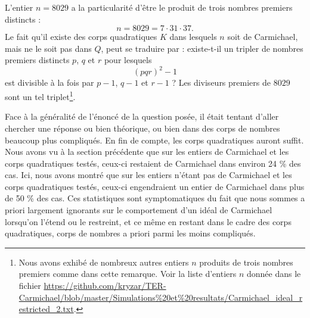 \begin{remarque}
	L'entier $n = 8029$ a la particularité d'être le produit de trois nombres premiers distincts : \[n = 8029 = 7 \cdot 31 \cdot 37.\] Le fait qu'il existe des corps quadratiques $K$ dans lesquels $n$ soit de Carmichael, mais ne le soit pas dans $Q$, peut se traduire par : existe-t-il un tripler de nombres premiers distincts $p$, $q$ et $r$ pour lesquels \[(pqr)^2 - 1\] est divisible à la fois par $p-1$, $q-1$ et $r-1$ ? Les diviseurs premiers de $8029$ sont un tel triplet\footnote{Nous avons exhibé de nombreux autres entiers $n$ produits de trois nombres premiers comme dans cette remarque. Voir la liste d'entiers $n$ donnée dans le fichier \url{https://github.com/kryzar/TER-Carmichael/blob/master/Simulations\%20et\%20resultats/Carmichael\_ideal\_restricted\_2.txt}.}.
\end{remarque}

Face à la généralité de l'énoncé de la question posée, il était tentant d'aller chercher une réponse ou bien théorique, ou bien dans des corps de nombres beaucoup plus compliqués. En fin de compte, les corps quadratiques auront suffit. Nous avons vu à la section précédente que sur les entiers de Carmichael et les corps quadratiques testés, ceux-ci restaient de Carmichael dans environ 24 \% des cas. Ici, nous avons montré que sur les entiers n'étant pas de Carmichael et les corps quadratiques testés, ceux-ci engendraient un entier de Carmichael dans plus de 50 \% des cas. Ces statistiques sont symptomatiques du fait que nous sommes a priori largement ignorants sur le comportement d'un idéal de Carmichael lorsqu'on l'étend ou le restreint, et ce même en restant dans le cadre des corps quadratiques, corps de nombres a priori parmi les moins compliqués.
